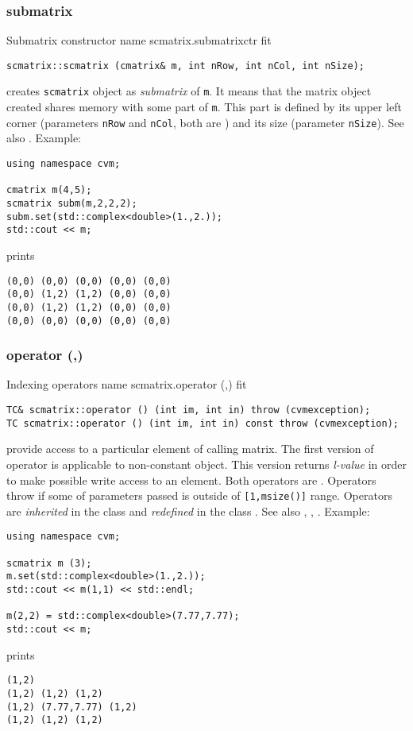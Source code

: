 \subsubsection{submatrix}
Submatrix constructor%
\pdfdest name {scmatrix.submatrixctr} fit
\begin{verbatim}
scmatrix::scmatrix (cmatrix& m, int nRow, int nCol, int nSize);
\end{verbatim}
creates  \verb"scmatrix" object as  \emph{submatrix} of \verb"m".
It means that the matrix object created shares  memory with some part
of \verb"m". This part is defined by its upper left corner (parameters 
\verb"nRow" and \verb"nCol", both are \Based)
and its size (parameter \verb"nSize").
See also .
Example:
\begin{Verbatim}
using namespace cvm;

cmatrix m(4,5);
scmatrix subm(m,2,2,2);
subm.set(std::complex<double>(1.,2.));
std::cout << m;
\end{Verbatim}
prints
\begin{Verbatim}
(0,0) (0,0) (0,0) (0,0) (0,0)
(0,0) (1,2) (1,2) (0,0) (0,0)
(0,0) (1,2) (1,2) (0,0) (0,0)
(0,0) (0,0) (0,0) (0,0) (0,0)
\end{Verbatim}
\newpage




\subsubsection{operator (,)}
Indexing operators%
\pdfdest name {scmatrix.operator (,)} fit
\begin{verbatim}
TC& scmatrix::operator () (int im, int in) throw (cvmexception);
TC scmatrix::operator () (int im, int in) const throw (cvmexception);
\end{verbatim}
provide access to a particular element of calling matrix. The first version
of  operator is applicable to  non-constant object.
This version returns \emph{l-value}
in order to make possible write access to an element.
Both operators are \Based.
Operators throw 
if some of parameters passed
is outside of \verb"[1,msize()]" range.
Operators are \emph{inherited}
in the class
and \emph{redefined}
in the class .
See also ,
,
.
Example:
\begin{Verbatim}
using namespace cvm;

scmatrix m (3);
m.set(std::complex<double>(1.,2.));
std::cout << m(1,1) << std::endl;

m(2,2) = std::complex<double>(7.77,7.77);
std::cout << m;
\end{Verbatim}
prints
\begin{Verbatim}
(1,2)
(1,2) (1,2) (1,2)
(1,2) (7.77,7.77) (1,2)
(1,2) (1,2) (1,2)
\end{Verbatim}
\newpage




